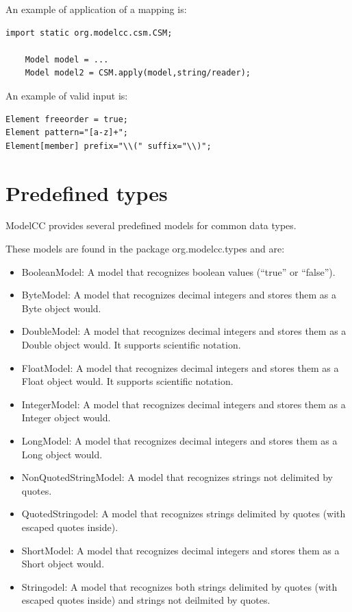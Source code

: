\documentclass[a4paper,twoside,onecolumn]{article}
\newenvironment{colframe}{%
  \begin{Sbox} 
    \begin{minipage}{.8\columnwidth} 
}{%

  \end{minipage} 
  \end{Sbox} 
  \begin{center} 
    \fcolorbox{black}{MyGray}{\TheSbox} 
  \end{center} 
}
\begin{document}
An example of application of a mapping is:

\begin{colframe}
\begin{verbatim}
import static org.modelcc.csm.CSM;

    Model model = ...
    Model model2 = CSM.apply(model,string/reader);
\end{verbatim}
\end{colframe}

An example of valid input is:

\begin{colframe}
\begin{verbatim}
Element freeorder = true;
Element pattern="[a-z]+";
Element[member] prefix="\\(" suffix="\\)";
\end{verbatim}
\end{colframe}

\section{Predefined types} \label{sec:predefinedtypes}

ModelCC provides several predefined models for common data types.

These models are found in the package org.modelcc.types and are:

\begin{itemize}
\item BooleanModel: A model that recognizes boolean values (``true'' or ``false'').
\item ByteModel: A model that recognizes decimal integers and stores them as a Byte object would.
\item DoubleModel: A model that recognizes decimal integers and stores them as a Double object would. It supports scientific notation.
\item FloatModel: A model that recognizes decimal integers and stores them as a Float object would. It supports scientific notation.
\item IntegerModel: A model that recognizes decimal integers and stores them as a Integer object would.
\item LongModel: A model that recognizes decimal integers and stores them as a Long object would.
\item NonQuotedStringModel: A model that recognizes strings not delimited by quotes.
\item QuotedStringodel: A model that recognizes strings delimited by quotes (with escaped quotes inside).
\item ShortModel: A model that recognizes decimal integers and stores them as a Short object would.
\item Stringodel: A model that recognizes both strings delimited by quotes (with escaped quotes inside) and strings not deilmited by quotes.
\end{itemize}
\end{document}
